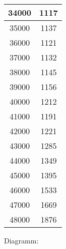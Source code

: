\documentclass[ngerman,a4paper]{report}
\begin{document}
\begin{tabular}{|c|c|}
34000 & 1117\\
\hline
35000 & 1137\\
\hline
36000 & 1121\\
\hline
37000 & 1132\\
\hline
38000 & 1145\\
\hline
39000 & 1156\\
\hline
40000 & 1212\\
\hline
41000 & 1191\\
\hline
42000 & 1221\\
\hline
43000 & 1285\\
\hline
44000 & 1349\\
\hline
45000 & 1395\\
\hline
46000 & 1533\\
\hline
47000 & 1669\\
\hline
48000 & 1876\\
\hline

\end{tabular}
Diagramm:
\end{document}
